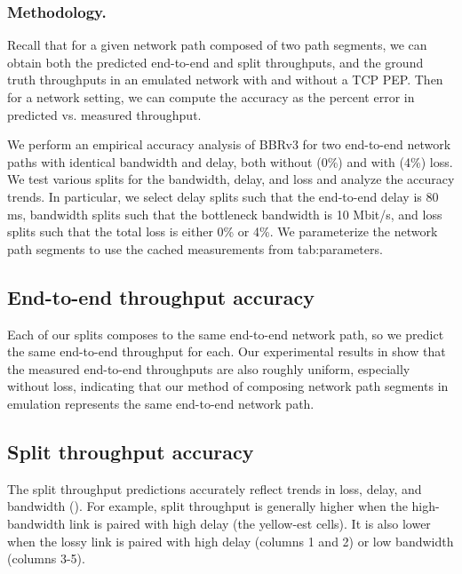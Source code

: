 \subsubsection{Methodology.}

Recall that for a given network path composed of two path segments, we can
obtain both the predicted end-to-end and split throughputs, and the ground
truth throughputs in an emulated network with and without a TCP PEP. Then for a
network setting, we can compute the accuracy as the percent error in predicted
vs. measured throughput.

We perform an empirical accuracy analysis of BBRv3 for two end-to-end network paths with
identical bandwidth and delay, both without (0\%) and with (4\%) loss. We test
various splits for the bandwidth, delay, and loss and analyze the accuracy
trends. In particular, we select delay splits such that the end-to-end delay is
80 ms, bandwidth splits such that the bottleneck bandwidth is 10 Mbit/s, and loss
splits such that the total loss is either 0\% or 4\%. We parameterize the network
path segments to use the cached measurements from \Cref
{tab:parameters}.

\subsection{End-to-end throughput accuracy}
\label{sec:splitting:accuracy:e2e}

Each of our splits composes to the same end-to-end network path, so we predict
the same end-to-end throughput for each. Our experimental
results in  show that the measured end-to-end
throughputs are also roughly uniform, especially without loss, indicating that
our method of composing network path segments in emulation represents the same
end-to-end network path.

\subsection{Split throughput accuracy}
\label{sec:splitting:accuracy:split}

The split throughput predictions accurately reflect trends in loss, delay, and
bandwidth (). For example, split throughput is
generally higher when the high-bandwidth link is paired with high delay
(the yellow-est cells). It is also lower when the lossy link is paired with
high delay (columns 1 and 2) or low bandwidth (columns 3-5).

